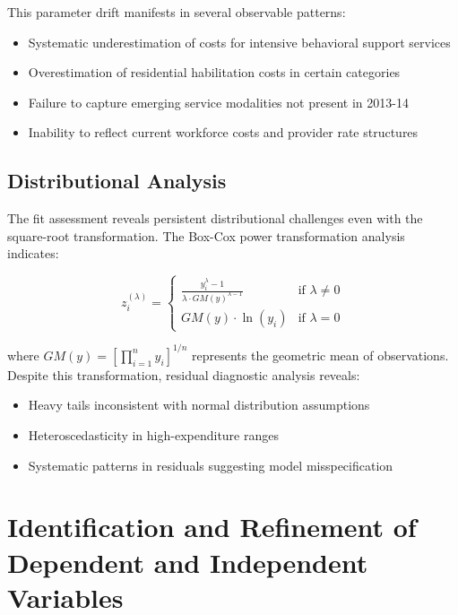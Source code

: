 This parameter drift manifests in several observable patterns:
\begin{itemize}
    \item Systematic underestimation of costs for intensive behavioral support services
    \item Overestimation of residential habilitation costs in certain categories
    \item Failure to capture emerging service modalities not present in 2013-14
    \item Inability to reflect current workforce costs and provider rate structures
\end{itemize}

\subsection{Distributional Analysis}

The fit assessment reveals persistent distributional challenges even with the square-root transformation. The Box-Cox power transformation analysis indicates:

\begin{equation}
z_i^{(\lambda)} = \begin{cases}
\frac{y_i^\lambda - 1}{\lambda \cdot GM(y)^{\lambda-1}} & \text{if } \lambda \neq 0 \\
GM(y) \cdot \ln(y_i) & \text{if } \lambda = 0
\end{cases}
\end{equation}

where $GM(y) = \left[\prod_{i=1}^n y_i\right]^{1/n}$ represents the geometric mean of observations. Despite this transformation, residual diagnostic analysis reveals:
\begin{itemize}
    \item Heavy tails inconsistent with normal distribution assumptions
    \item Heteroscedasticity in high-expenditure ranges
    \item Systematic patterns in residuals suggesting model misspecification
\end{itemize}

\section{Identification and Refinement of Dependent and Independent Variables}

